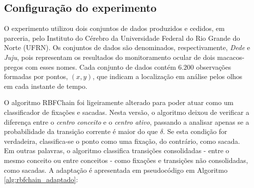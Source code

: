 \documentclass[msc, classic, a4paper]{ufbathesis}
\begin{document}
\subsection{Configuração do experimento}
\label{sec:configuracao_experimento_fixacoes_sacadas}

O experimento utilizou dois conjuntos de dados produzidos e cedidos, em parceria, pelo Instituto do Cérebro da Universidade Federal do Rio Grande do Norte (UFRN). 
Os conjuntos de dados são denominados, respectivamente, \textit{Dede} e \textit{Juju}, pois representam os resultados do monitoramento ocular de dois macacos-pregos com esses nomes.
Cada conjunto de dados contém $6.200$ observações formadas por pontos, $(x, y)$, que indicam a localização em análise pelos olhos em cada instante de tempo.

O algoritmo RBFChain foi ligeiramente alterado para poder atuar como um classificador de fixações e sacadas. Nesta versão, o algoritmo deixou de verificar a diferença entre o \textit{centro conceito} e o \textit{centro ativo}, passando a analisar apenas se a probabilidade da transição corrente é maior do que $\delta$. Se esta condição for verdadeira, classifica-se o ponto como uma fixação, do contrário, como sacada. 
Em outras palavras, o algoritmo classifica transições consolidadas - entre o mesmo conceito ou entre conceitos - como fixações e transições não consolidadas, como sacadas.
A adaptação é apresentada em pseudocódigo em Algoritmo \ref{alg:rbfchain_adaptado}:
\end{document}

